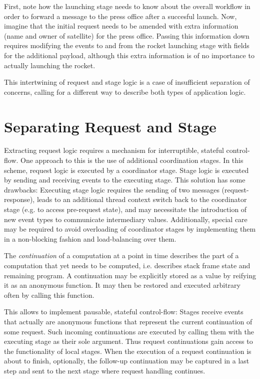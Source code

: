 \documentclass[preprint]{sigplanconf}
\begin{document}
First, note how the launching stage needs to know about the overall workflow in order to forward a
message to the press office after a succesful launch. Now, imagine that the initial request needs to
be amended with extra information (name and owner of satellite) for the press office. Passing this
information down requires modifying the events to and from the rocket launching stage with fields
for the additional payload, although this extra information is of no importance to actually
launching the rocket.

This intertwining of request and stage logic is a case of insufficient separation of concerns,
calling for a different way to describe both types of application logic.
                                                      

\section{Separating Request and Stage}

Extracting request logic requires a mechanism for interruptible, stateful control-flow. One approach
to this is the use of additional coordination stages. In this scheme, request logic is executed by a
coordinator stage. Stage logic is executed by sending and receiving events to the executing stage.
This solution has some drawbacks: Executing stage logic requires the sending of two messages
(request-response), leads to an additional thread context switch back to the coordinator stage (e.g.
to access pre-request state), and may necessitate the introduction of new event types to communicate
intermediary values. Additionally, special care may be required to avoid overloading of coordinator
stages by implementing them in a non-blocking fashion and load-balancing over them.

The \emph{continuation} of a computation at a point in time describes the part of a computation that
yet needs to be computed, i.e. describes stack frame state and remaining program. A continuation may
be explicitly stored as a value by reifying it as an anonymous function. It may then be restored and
executed arbitrary often by calling this function.

This allows to implement pausable, stateful control-flow: Stages receive events that actually are
anonymous functions that represent the current continuation of some request. Such incoming
continuations are executed by calling them with the executing stage as their sole argument. Thus
request continuations gain access to the functionality of local stages. When the execution of a
request continuation is about to finish, optionally, the follow-up continuation may be captured in a
last step and sent to the next stage where request handling continues.
\end{document}
